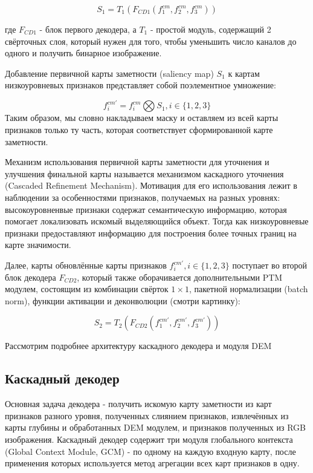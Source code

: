 \begin{equation}
    S_1 = T_1(F_{CD1}(f_1^{cm},f_2^{cm},f_3^{cm}))
\end{equation}

где $F_{CD1}$ - блок первого декодера, а $T_1$ - простой модуль, содержащий 2 свёрточных слоя, который
нужен для того, чтобы уменьшить число каналов до одного и получить бинарное изображение.

Добавление первичной карты заметности (saliency map) $S_1$ к картам низкоуровневых признаков представляет собой
поэлементное умножение:

\begin{equation}
    f_i^{cm'} = f_i^{cm} \bigotimes S_1, i \in \{1,2,3\}
\end{equation}
Таким образом, мы словно накладываем маску и оставляем из всей карты признаков только ту часть, которая соответствует 
сформированной карте заметности.

Механизм использования первичной карты заметности для уточнения и улучшения финальной карты называется механизмом каскадного уточнения (Cascaded Refinement Mechanism).
Мотивация для его использования лежит в наблюдении за особенностями признаков, получаемых на разных уровнях: высокоуровненвые признаки содержат семантическую информацию,
которая помогает локализовать искомый выделяющийся объект. Тогда как низкоуровневые признаки предоставляют информацию для построения более точных границ на карте значимости.

Далее, карты обновлённые карты признаков $f_i^{cm'}, i \in \{1,2,3\} $ поступает во второй блок декодера $F_{CD2}$, который также оборачивается дополнительными PTM модулем,
состоящим из комбинации свёрток $1 \times 1$, пакетной нормализации (batch norm), функции активации и деконволюции (смотри картинку):

\begin{equation}
    S_2 = T_2(F_{CD2}(f_1^{cm'},f_2^{cm'},f_3^{cm'}))
\end{equation}


Рассмотрим подробнее архитектуру каскадного декодера и модуля DEM

\subsection{Каскадный декодер}
Основная задача декодера - получить искомую карту заметности из карт признаков разного уровня, полученных слиянием признаков,
извлечённых из карты глубины и обработанных DEM модулем, и признаков полученных из RGB изображения.
Каскадный декодер содержит три модуля глобального контекста (Global Context Module, GCM) - по одному на каждую входную карту, после применения которых
используется метод агрегации всех карт признаков в одну. 

